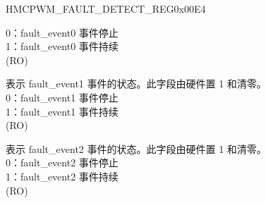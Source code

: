 \begin{register}{H}{MCPWM\_FAULT\_DETECT\_REG}{0x00E4}
\begin{regdesc}
\begin{reglist}
0：fault\_event0 事件停止\\
1：fault\_event0 事件持续\\
(RO)
\label{fielddesc:MCPWMEVENTF1}\item [MCPWM\_EVENT\_F1] 表示 fault\_event1 事件的状态。此字段由硬件置 1 和清零。\\
0：fault\_event1 事件停止\\
1：fault\_event1 事件持续\\
(RO)
\label{fielddesc:MCPWMEVENTF2}\item [MCPWM\_EVENT\_F2] 表示 fault\_event2 事件的状态。此字段由硬件置 1 和清零。\\
0：fault\_event2 事件停止\\
1：fault\_event2 事件持续\\
(RO)
\end{reglist}\end{regdesc}
\end{register}


